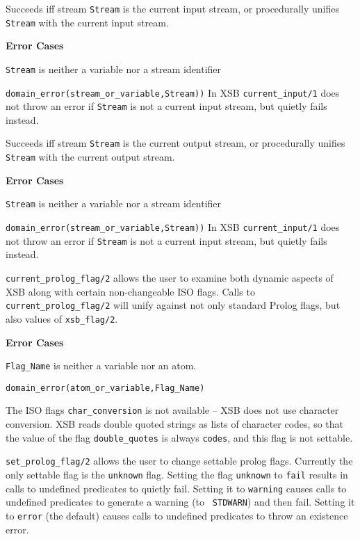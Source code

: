 \begin{description}

    Succeeds iff stream {\tt Stream} is the current input stream, or 
    procedurally unifies {\tt Stream} with the current input stream.

{\bf Error Cases}
\bi
\item 	{\tt Stream} is neither a variable nor a stream identifier
\bi
\item 	{\tt domain\_error(stream\_or\_variable,Stream))}
\ei
\ei
%
\compatability 
%
In XSB {\tt current\_input/1} does not throw an error if {\tt Stream}
is not a current input stream, but quietly fails instead.

    Succeeds iff stream {\tt Stream} is the current output stream, or 
    procedurally unifies {\tt Stream} with the current output stream.

{\bf Error Cases}
\bi
\item 	{\tt Stream} is neither a variable nor a stream identifier
\bi
\item 	{\tt domain\_error(stream\_or\_variable,Stream))}
\ei
\ei
%
\compatability 
%
In XSB {\tt current\_input/1} does not throw an error if {\tt Stream}
is not a current input stream, but quietly fails instead.

%
{\tt current\_prolog\_flag/2} allows the user to examine both dynamic
aspects of XSB along with certain non-changeable ISO flags.  Calls to
{\tt current\_prolog\_flag/2} will unify against not only standard
Prolog flags, but also values of {\tt xsb\_flag/2}.

{\bf Error Cases}
\bi
\item 	{\tt Flag\_Name} is neither a variable nor an atom.
\bi
\item 	{\tt domain\_error(atom\_or\_variable,Flag\_Name)}
\ei
\ei

\compatability The ISO flags {\tt char\_conversion} is not available
-- XSB does not use character conversion.  XSB reads double quoted
strings as lists of character codes, so that the value of the flag
{\tt double\_quotes} is always {\tt codes}, and this flag is not
settable.

%
{\tt set\_prolog\_flag/2} allows the user to change settable prolog
flags.  Currently the only settable flag is the {\tt unknown} flag.
Setting the flag {\tt unknown} to {\tt fail} results in calls to
undefined predicates to quietly fail.  Setting it to {\tt warning}
causes calls to undefined predicates to generate a warning (to {\tt
  STDWARN}) and then fail.  Setting it to {\tt error} (the default)
causes calls to undefined predicates to throw an existence error.


\end{description}
